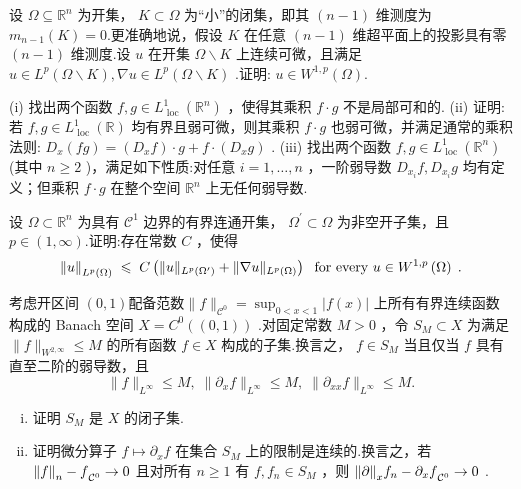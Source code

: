 \begin{rbhw}
设 $\Omega  \subseteq  {\mathbb{R}}^{n}$ 为开集， $K \subset  \Omega$ 为“小”的闭集，即其 $\left( {n - 1}\right)$ 维测度为 ${m}_{n - 1}\left( K\right)  = 0$.更准确地说，假设 $K$ 在任意 $\left( {n - 1}\right)$ 维超平面上的投影具有零 $\left( {n - 1}\right)$ 维测度.设 $u$ 在开集 $\Omega  \backslash  K$ 上连续可微，且满足 $u \in  {L}^{p}\left( {\Omega  \backslash  K}\right) ,\nabla u \in  {L}^{p}\left( {\Omega  \backslash  K}\right)$ .证明: $u \in  {W}^{1,p}\left( \Omega \right)$.
\end{rbhw}

\begin{rbhw}
(i) 找出两个函数 $f,g \in  {L}_{\text{ loc }}^{1}\left( {\mathbb{R}}^{n}\right)$ ，使得其乘积 $f \cdot  g$ 不是局部可和的.
(ii) 证明:若 $f,g \in  {L}_{\text{ loc }}^{1}\left( \mathbb{R}\right)$ 均有界且弱可微，则其乘积 $f \cdot  g$ 也弱可微，并满足通常的乘积法则: ${D}_{x}\left( {fg}\right)  = \left( {{D}_{x}f}\right)  \cdot  g + f \cdot  \left( {{D}_{x}g}\right)$ .
(iii) 找出两个函数 $f,g \in  {L}_{\text{ loc }}^{1}\left( {\mathbb{R}}^{n}\right)$ (其中 $n \geq  2$ )，满足如下性质:对任意 $i = 1,\ldots ,n$ ，一阶弱导数 ${D}_{{x}_{i}}f,{D}_{{x}_{i}}g$ 均有定义；但乘积 $f \cdot  g$ 在整个空间 ${\mathbb{R}}^{n}$ 上无任何弱导数.
\end{rbhw}

\begin{rbhw}
设 $\Omega  \subset  {\mathbb{R}}^{n}$ 为具有 ${\mathcal{C}}^{1}$ 边界的有界连通开集， ${\Omega }^{\prime } \subset  \Omega$ 为非空开子集，且 $p \in  \left(  {1,\infty }\right)$.证明:存在常数 $C$ ，使得
\[
\norm{u}_{{L}^{p}\left( \Omega \right) }\; \leqslant  \;C\left( {\| u{\| }_{{L}^{p}\left( {\Omega }^{\prime }\right) } + \| \nabla u{\| }_{{L}^{p}\left( \Omega \right) }}\right) \;\text{ for every }u \in  {W}^{1,p}\left( \Omega \right) \;.
\]
\end{rbhw}

\begin{rbhw}
考虑开区间 $(0,1)$配备范数$\|f\|_{{\mathcal{C}}^{0}} = \sup_{{0 < x < 1}}{\left| {f\left( x\right) }\right|}$ 上所有有界连续函数构成的 Banach 空间 $X = {C}^{0}\left( {( 0,1) }\right)$ .对固定常数 $M > 0$ ，令 ${S}_{M} \subset  X$ 为满足 $\| f{\| }_{{W}^{2,\infty }} \leq  M$ 的所有函数 $f \in  X$ 构成的子集.换言之， $f \in  {S}_{M}$ 当且仅当 $f$ 具有直至二阶的弱导数，且
\[
\| f{\| }_{{L}^{\infty }} \leq  M,\;\| {\partial }_{x}f{\| }_{{L}^{\infty }} \leq  M,\;\| {\partial }_{xx}f{\| }_{{L}^{\infty }} \leq  M.
\]
\begin{enumerate}[(i)]
    \item 证明 ${S}_{M}$ 是 $X$ 的闭子集.
    \item 证明微分算子 $f \mapsto  {\partial }_{x}f$ 在集合 ${S}_{M}$ 上的限制是连续的.换言之，若 ${\norm{f}_{n} - f}_{{\mathcal{C}}^{0}} \rightarrow  0$ 且对所有 $n \geq  1$ 有 $f,{f}_{n} \in  {S}_{M}$ ，则 ${\norm{\partial }_{x}{f}_{n} - {\partial }_{x}f}_{{\mathcal{C}}^{0}} \rightarrow  0$ .
\end{enumerate}
\end{rbhw}

